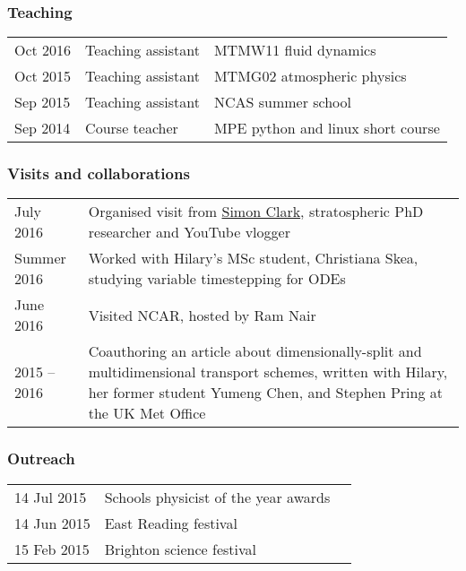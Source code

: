 \documentclass[a4paper,11pt]{article}
\begin{document}
\subsubsection*{Teaching}
\begin{tabular}{l l l}
Oct 2016 & Teaching assistant & MTMW11 fluid dynamics \\
Oct 2015 & Teaching assistant & MTMG02 atmospheric physics \\
Sep 2015 & Teaching assistant & NCAS summer school \\
Sep 2014 & Course teacher & MPE python and linux short course \\
\end{tabular}

\subsubsection*{Visits and collaborations}
\begin{tabularx}{\linewidth}{l X}
July 2016 & Organised visit from \href{https://www.youtube.com/user/SimonOxfPhys}{Simon Clark}, stratospheric PhD researcher and YouTube vlogger \\
Summer 2016 & Worked with Hilary's MSc student, Christiana Skea, studying variable timestepping for ODEs \\
June 2016 & Visited NCAR, hosted by Ram Nair \\
2015 -- 2016 & Coauthoring an article about dimensionally-split and multidimensional transport schemes, written with Hilary, her former student Yumeng Chen, and Stephen Pring at the UK Met Office \\
\end{tabularx}

\subsubsection*{Outreach}
\begin{tabular}{l l l}
14 Jul 2015 & Schools physicist of the year awards \\
14 Jun 2015 & East Reading festival \\
15 Feb 2015 & Brighton science festival \\
\end{tabular}
\end{document}
